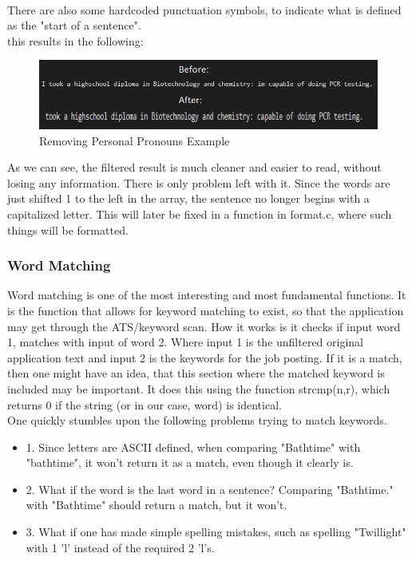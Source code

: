 \\
There are also some hardcoded punctuation symbols, to indicate what is defined as the "start of a sentence". 
\\
this results in the following:
\begin{figure}[H]
  \centering
  \includegraphics[scale = 0.6]{figures/personal_pronoun_ex.png}
  \caption{Removing Personal Pronouns Example}\label{fig:ie}
\end{figure}

As we can see, the filtered result is much cleaner and easier to read, without losing any information.
There is only problem left with it. Since the words are just shifted 1 to the left in the array, the sentence no longer begins
with a capitalized letter. This will later be fixed in a function in format.c, where such things will be formatted.

\subsubsection{Word Matching}
Word matching is one of the most interesting and most fundamental functions. 
It is the function that allows for keyword matching to exist, so that the application
may get through the ATS/keyword scan. How it works is it checks if input word 1, matches with input of word 2.
Where input 1 is the unfiltered original application text and input 2 is the keywords for the job posting.
If it is a match, then one might have an idea, that this section where the matched keyword is included may be important.
It does this using the function strcmp(n,r), which returns 0 if the string (or in our case, word) is identical.
\\
One quickly stumbles upon the following problems trying to match keywords.
\begin{itemize}
  \item 1. Since letters are ASCII defined, when comparing "Bathtime" with "bathtime", it won't return it as a match, even though it clearly is.
  \item 2. What if the word is the last word in a sentence? Comparing "Bathtime." with "Bathtime" should return a match, but it won't.
  \item 3. What if one has made simple spelling mistakes, such as spelling "Twillight" with 1 'l' instead of the required 2 'l's.
\end{itemize}


